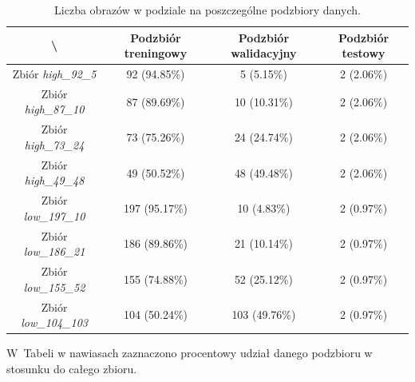\begin{table}[H]
	\centering
	\caption{Liczba obrazów w podziale na poszczególne podzbiory danych.}
	\vspace{6pt}
	{
    \footnotesize
    \begin{tabular}{|c|c|c|c|}
      \hline \textbackslash & Podzbiór treningowy & Podzbiór walidacyjny & Podzbiór testowy \\
      \hline Zbiór \textit{high\_92\_5} & 92 (94.85\%) & 5 (5.15\%) & 2 (2.06\%) \\
      \hline Zbiór \textit{high\_87\_10} & 87 (89.69\%) & 10 (10.31\%) & 2 (2.06\%) \\
      \hline Zbiór \textit{high\_73\_24} & 73 (75.26\%) & 24 (24.74\%) & 2 (2.06\%) \\
      \hline Zbiór \textit{high\_49\_48} & 49 (50.52\%) & 48 (49.48\%) & 2 (2.06\%) \\
      \hline
      \hline Zbiór \textit{low\_197\_10} & 197 (95.17\%) & 10 (4.83\%) & 2 (0.97\%) \\
      \hline Zbiór \textit{low\_186\_21} & 186 (89.86\%) & 21 (10.14\%) & 2 (0.97\%) \\
      \hline Zbiór \textit{low\_155\_52} & 155 (74.88\%) & 52 (25.12\%) & 2 (0.97\%) \\
      \hline Zbiór \textit{low\_104\_103} & 104 (50.24\%) & 103 (49.76\%) & 2 (0.97\%) \\
      \hline
    \end{tabular}
    \label{Tab:podzial}
	}
	\vspace{0pt}
\end{table}

W~Tabeli  w nawiasach zaznaczono procentowy udział danego podzbioru w stosunku do całego zbioru.
